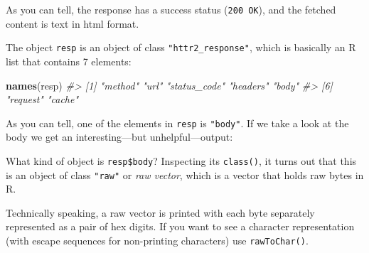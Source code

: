 \documentclass[
]{book}
\newenvironment{Shaded}{\begin{snugshade}}{\end{snugshade}}
\newcommand{\CommentTok}[1]{\textcolor[rgb]{0.56,0.35,0.01}{\textit{#1}}}
\newcommand{\FunctionTok}[1]{\textcolor[rgb]{0.13,0.29,0.53}{\textbf{#1}}}
\newcommand{\NormalTok}[1]{#1}
\newcommand{\OtherTok}[1]{\textcolor[rgb]{0.56,0.35,0.01}{#1}}
\newcommand{\SpecialCharTok}[1]{\textcolor[rgb]{0.81,0.36,0.00}{\textbf{#1}}}
\begin{document}
As you can tell, the response has a success status (\texttt{200\ OK}), and the fetched
content is text in html format.

The object \texttt{resp} is an object of class \texttt{"httr2\_response"}, which is basically
an R list that contains 7 elements:

\begin{Shaded}
\begin{Highlighting}[]
\FunctionTok{names}\NormalTok{(resp)}
\CommentTok{\#\textgreater{} [1] "method"      "url"         "status\_code" "headers"     "body"       }
\CommentTok{\#\textgreater{} [6] "request"     "cache" }
\end{Highlighting}
\end{Shaded}

As you can tell, one of the elements in \texttt{resp} is \texttt{"body"}. If we take a look
at the body we get an interesting---but unhelpful---output:

\begin{Shaded}
\end{Shaded}

What kind of object is \texttt{resp\$body}? Inspecting its \texttt{class()}, it turns out
that this is an object of class \texttt{"raw"} or \emph{raw vector}, which is a vector
that holds raw bytes in R.

\begin{Shaded}
\end{Shaded}

Technically speaking, a raw vector is printed with each byte separately
represented as a pair of hex digits. If you want to see a character
representation (with escape sequences for non-printing characters) use
\texttt{rawToChar()}.

\begin{Shaded}
\end{Shaded}
\end{document}
